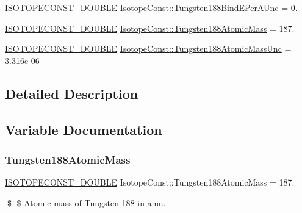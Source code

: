 \begin{DoxyCompactItemize}
\mbox{\hyperlink{group___isotope_const-_macros_ga8f45a7272ce02c0b4c65c44636ed719a}{I\+S\+O\+T\+O\+P\+E\+C\+O\+N\+S\+T\+\_\+\+D\+O\+U\+B\+LE}} \mbox{\hyperlink{group___isotope_const-_tungsten-_w188_ga863d1e1e356490cb18ce3bc1433f98c6}{Isotope\+Const\+::\+Tungsten188\+Bind\+E\+Per\+A\+Unc}} = 0.
\item 
\mbox{\hyperlink{group___isotope_const-_macros_ga8f45a7272ce02c0b4c65c44636ed719a}{I\+S\+O\+T\+O\+P\+E\+C\+O\+N\+S\+T\+\_\+\+D\+O\+U\+B\+LE}} \mbox{\hyperlink{group___isotope_const-_tungsten-_w188_gae4d6af92e3de9a7e684876df23023b83}{Isotope\+Const\+::\+Tungsten188\+Atomic\+Mass}} = 187.
\item 
\mbox{\hyperlink{group___isotope_const-_macros_ga8f45a7272ce02c0b4c65c44636ed719a}{I\+S\+O\+T\+O\+P\+E\+C\+O\+N\+S\+T\+\_\+\+D\+O\+U\+B\+LE}} \mbox{\hyperlink{group___isotope_const-_tungsten-_w188_ga8cb45ca2fc9901a9302573f66b2e54df}{Isotope\+Const\+::\+Tungsten188\+Atomic\+Mass\+Unc}} = 3.\+316e-\/06
\end{DoxyCompactItemize}


\subsection{Detailed Description}


\subsection{Variable Documentation}
\mbox{\label{group___isotope_const-_tungsten-_w188_gae4d6af92e3de9a7e684876df23023b83}} 
\subsubsection{\texorpdfstring{Tungsten188\+Atomic\+Mass}{Tungsten188AtomicMass}}
{\footnotesize\ttfamily \mbox{\hyperlink{group___isotope_const-_macros_ga8f45a7272ce02c0b4c65c44636ed719a}{I\+S\+O\+T\+O\+P\+E\+C\+O\+N\+S\+T\+\_\+\+D\+O\+U\+B\+LE}} Isotope\+Const\+::\+Tungsten188\+Atomic\+Mass = 187.}

\$ \$ Atomic mass of Tungsten-\/188 in amu. \mbox{\label{group___isotope_const-_tungsten-_w188_ga8cb45ca2fc9901a9302573f66b2e54df}} 
